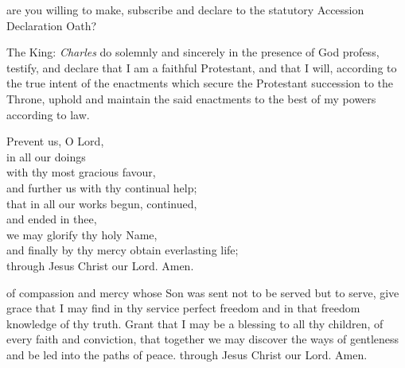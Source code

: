 {\clearpage 
{}

 are you willing to make, subscribe and declare to the
statutory Accession Declaration Oath?



\vfill 
The King:
 \textit{Charles} do solemnly and sincerely in the presence of God profess, testify,
and declare that I am a faithful Protestant, and that I will, according to the
true intent of the enactments which secure the Protestant succession to
the Throne, uphold and maintain the said enactments to the best of my
powers according to law.
\vfill 


\vfill 

\begin{center}
	
Prevent us, O Lord,\\ in all our doings \\with thy most gracious favour, \\and
further us with thy continual help;\\ that in all our works begun, continued,\\
and ended in thee,\\ we may glorify thy holy Name, \\and finally by thy mercy
obtain everlasting life; \\through Jesus Christ our Lord.
Amen.
\end{center}

\vfill 


 of compassion and mercy
whose Son was sent not to be served but to serve,
give grace that I may find in thy service perfect freedom
and in that freedom knowledge of thy truth.
Grant that I may be a blessing to all thy children, of every faith and conviction,
that together we may discover the ways of gentleness
and be led into the paths of peace.
through Jesus Christ our Lord.
Amen.
\vfill 
\clearpage

\mbox{}


}
